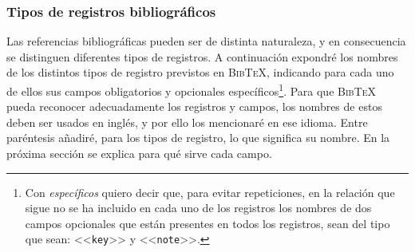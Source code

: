 \documentclass[a4paper,11pt]{article}
\def\btx-{\textsc{Bib\TeX}}
\def\ltr#1-{<<\texttt{#1}>>}
\begin{document}
\subsubsection{Tipos de registros bibliográficos}
\label{sec:registr-bibl}

Las  referencias  bibliográficas  pueden  ser  de distinta  naturaleza,  y  en
consecuencia  se distinguen  diferentes  tipos de  registros.  A  continuación
expondré los  nombres de los distintos  tipos de registro  previstos en \btx-,
indicando  para  cada  uno  de  ellos sus  campos  obligatorios  y  opcionales
específicos\footnote{Con  \emph{específicos}  quiero  decir que,  para  evitar
  repeticiones, en la relación que sigue no  se ha incluido en cada uno de los
  registros los nombres de dos  campos opcionales que están presentes en todos
  los registros, sean del tipo que sean:  \ltr key- y \ltr note-.  }. Para que
\btx- pueda  reconocer adecuadamente  los registros y  campos, los  nombres de
estos deben  ser usados en  inglés, y por  ello los mencionaré en  ese idioma.
Entre  paréntesis añadiré, para  los tipos  de registro,  lo que  significa su
nombre.  En la próxima sección se explica para qué sirve cada campo.
\end{document}
